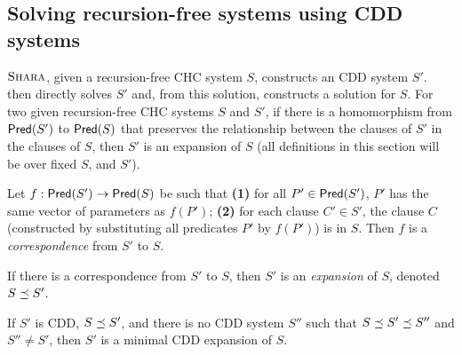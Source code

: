 \subsection{Solving recursion-free systems using CDD systems}
\label{sec:core-solver}

$\textsc{Shara}$, given a recursion-free CHC system $S$,
constructs an CDD system $S'$.
%
\sys then directly solves $S'$ and, from this solution, constructs a solution
for $S$.
For two given recursion-free CHC systems $S$ and $S'$, if
there is a homomorphism from $\mathsf{Pred}( S' )$ to $\mathsf{Pred}( S )$ that
preserves the relationship between the clauses of $S'$ in
the clauses of $S$, then $S'$ is an expansion of
$S$ (all definitions in this section will be over fixed
$S$, and $S'$).
\begin{defn}
  \label{defn:expansion}
  Let $f : \mathsf{Pred}( S' ) \to \mathsf{Pred}( S )$ be such that
  \textbf{(1)} for all $P' \in \mathsf{Pred}( S' )$, $P'$ has the
  same vector of parameters as $f(P')$;
  \textbf{(2)} for each clause $C' \in S'$, the clause $C$ (constructed
  by substituting all predicates $P'$ by $f(P')$) is in $S$.
  Then $f$ is a \emph{correspondence} from $S'$ to $S$.
\end{defn}
%
If there is a correspondence from $S'$ to $S$, then $S'$ is an \emph{expansion}
of $S$, denoted $S \preceq S'$.

%
\begin{defn}
  \label{defn:min-expansion}
  If $S'$ is CDD, $S \preceq S'$, and there is no CDD system $S''$ such that $S \preceq S' \preceq S''$ and
  $S'' \neq S'$, then $S'$ is a minimal CDD expansion of $S$.
\end{defn}

